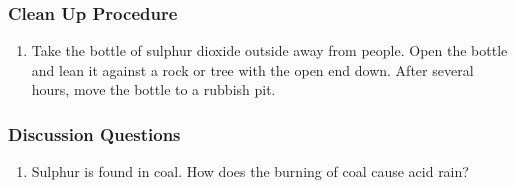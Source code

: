 \subsubsection*{Clean Up Procedure}
\begin{enumerate}
\item{Take the bottle of sulphur dioxide outside away from people. Open the bottle and lean it against a rock or tree with the open end down. After several hours, move the bottle to a rubbish pit.}
\end{enumerate}

\subsubsection*{Discussion Questions}
\begin{enumerate}
\item{Sulphur is found in coal. How does the burning of coal cause acid rain?}
\end{enumerate}